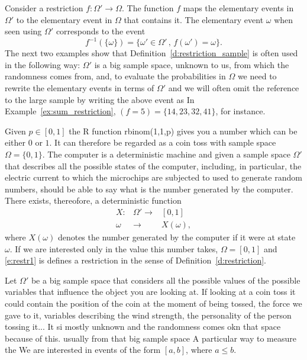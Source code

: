 	Consider a restriction $f:\Omega' \to \Omega$. The function $f$ maps the elementary events in $\Omega'$ to the elementary event in $\Omega$ that contains it. The elementary event $\omega$ when seen using $\Omega'$ corresponds to the event 
	\begin{equation}
		\label{e:push_forward}
			f^{-1}(\{\omega\})  = \{\omega' \in \Omega' \,,\, f(\omega' ) = \omega\}.
	\end{equation}
	The next two examples show that Definition~\ref{d:restriction_sample} is often used in the following way:  $\Omega'$ is a big sample space, unknown to us, from which the randomness comes from, and, to evaluate the probabilities in $\Omega$ we need to rewrite the elementary events in terms of $\Omega'$ 
	and we will often omit the reference to the large sample by writing the above event as 
	In Example~\ref{ex:sum_restriction}, $(f = 5 ) = \{14, 23,32,41\}$, for instance.  
	\begin{example}
		\label{ex:computer}
			Given $p \in [0,1]$ the R function rbinom(1,1,p) gives you a number which can be either $0$ or $1$. It can therefore be regarded as a coin toss with sample space $\Omega = \{0,1\}$. The computer is a deterministic machine and given a sample space $\Omega'$ that describes all the possible states of the computer, including, in particular, the electric current to which the microchips are subjected to used to generate random numbers, should be able to say what is the number generated by the computer. There exists, thereofore, a deterministic function 
	\begin{equation}
	\label{e:restr1}
		\begin{array}{ccc}
			X: & \Omega' \to &  [0,1]\\
			 \omega & \to &  X(\omega ),
		\end{array}
	\end{equation}
	where $X(\omega)$ denotes the number generated by the computer if it were at state $\omega$. If we are interested only in the value this number takes, $\Omega = [0,1]$ and \eqref{e:restr1} is defines a restriction in the sense of Definition~\ref{d:restriction}.  
	\end{example}
	
	\begin{example}
		\label{ex:random_variable}
		Let $\Omega'$ be a big sample space that considers all the possible values of the possible variables that influence the object you are looking at. If looking at a coin toss it could contain the position of the coin at the moment of being tossed, the force we gave to it, variables describing the wind strength, the personality of the person tossing it... It si mostly unknown and the randomness comes okn that space because of this. usually from that big sample space  
		A particular way to measure the 
		We are interested in events of the form $[a, b]$, where $a \leq b$.  
	\end{example}



